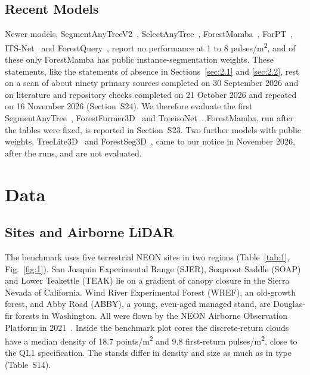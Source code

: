 \documentclass[journal]{IEEEtran}
\begin{document}
\subsection{Recent Models}\label{sec:2.3}

Newer models, SegmentAnyTreeV2~\cite{wielgosz2026segmentanytreev2}, SelectAnyTree~\cite{nguyen2026selectanytree}, ForestMamba~\cite{nguyen2026forestmamba}, ForPT~\cite{yue2026toward}, ITS-Net~\cite{li2026itsnet} and ForestQuery~\cite{zhan2026forestquery}, report no performance at 1 to 8 pulses/m\textsuperscript{2}, and of these
only ForestMamba has public instance-segmentation weights. These statements,
like the statements of absence in Sections~\ref{sec:2.1} and \ref{sec:2.2}, rest on a scan of about
ninety primary sources completed on 30 September 2026 and on literature and
repository checks completed on 21 October 2026 and repeated on 16 November 2026
(Section~S24). We therefore evaluate the first SegmentAnyTree~\cite{wielgosz2024segmentanytree}, ForestFormer3D~\cite{xiang2025forestformer3d} and
TreeisoNet~\cite{xi2025new}. ForestMamba, run after the tables were fixed, is
reported in Section~S23. Two further models with public weights, TreeLite3D~\cite{rizaldy2026labelefficient} and ForestSeg3D~\cite{zhang2026forestseg3d}, came to
our notice in November 2026, after the runs, and are not evaluated.

\section{Data}\label{sec:3}

\subsection{Sites and Airborne LiDAR}\label{sec:3.1}

The benchmark uses five terrestrial NEON sites in two regions (Table~\ref{tab:1}, Fig.~\ref{fig:1}).
San Joaquin Experimental Range (SJER), Soaproot Saddle (SOAP) and Lower
Teakettle (TEAK) lie on a gradient of canopy closure in the Sierra Nevada of
California. Wind River Experimental Forest (WREF), an old-growth forest, and
Abby Road (ABBY), a young, even-aged managed stand, are Douglas-fir forests in
Washington. All were flown by the NEON Airborne Observation Platform in 2021~\cite{neon2026discrete}. Inside the benchmark plot cores the discrete-return clouds
have a median density of 18.7 points/m\textsuperscript{2} and 9.8 first-return pulses/m\textsuperscript{2}, close to
the QL1 specification. The stands differ in density and size as much as in type
(Table~S14).
\end{document}
